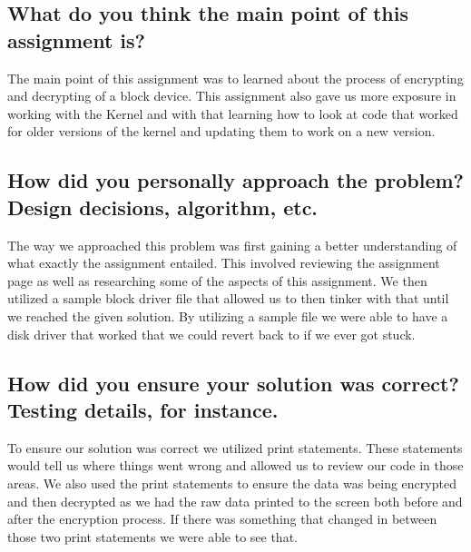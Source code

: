 \documentclass[letterpaper,onecolumn,11pt,titlepage]{IEEEtran}
\begin{document}
\subsection{What do you think the main point of this assignment is?}
\par The main point of this assignment was to learned about the process of encrypting and decrypting of a block device. This assignment also gave us more exposure in working with the Kernel and with that learning how to look at code that worked for older versions of the kernel and updating them to work on a new version.


\subsection{How did you personally approach the problem? Design decisions, algorithm, etc.}
\par The way we approached this problem was first gaining a better understanding of what exactly the assignment entailed. This involved reviewing the assignment page as well as researching some of the aspects of this assignment. We then utilized a sample block driver file that allowed us to then tinker with that until we reached the given solution. By utilizing a sample file we were able to have a disk driver that worked that we could revert back to if we ever got stuck.


\subsection{How did you ensure your solution was correct? Testing details, for instance.}
\par To ensure our solution was correct we utilized print statements. These statements would tell us where things went wrong and allowed us to review our code in those areas. We also used the print statements to ensure the data was being encrypted and then decrypted as we had the raw data printed to the screen both before and after the encryption process. If there was something that changed in between those two print statements we were able to see that.
\end{document}
